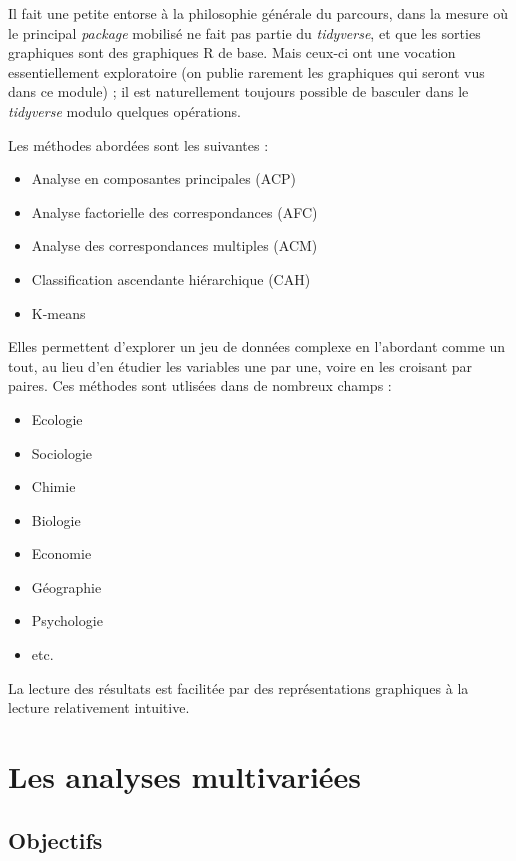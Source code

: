 \documentclass[]{book}
\providecommand{\tightlist}{%
  \setlength{\itemsep}{0pt}\setlength{\parskip}{0pt}}
\begin{document}
Il fait une petite entorse à la philosophie générale du parcours, dans la mesure où le principal \emph{package} mobilisé ne fait pas partie du \emph{tidyverse}, et que les sorties graphiques sont des graphiques R de base. Mais ceux-ci ont une vocation essentiellement exploratoire (on publie rarement les graphiques qui seront vus dans ce module) ; il est naturellement toujours possible de basculer dans le \emph{tidyverse} modulo quelques opérations.

Les méthodes abordées sont les suivantes :

\begin{itemize}
\tightlist
\item
  Analyse en composantes principales (ACP)
\item
  Analyse factorielle des correspondances (AFC)
\item
  Analyse des correspondances multiples (ACM)
\item
  Classification ascendante hiérarchique (CAH)
\item
  K-means
\end{itemize}

Elles permettent d'explorer un jeu de données complexe en l'abordant comme un tout, au lieu d'en étudier les variables une par une, voire en les croisant par paires. Ces méthodes sont utlisées dans de nombreux champs :

\begin{itemize}
\tightlist
\item
  Ecologie
\item
  Sociologie
\item
  Chimie
\item
  Biologie
\item
  Economie
\item
  Géographie
\item
  Psychologie
\item
  etc.
\end{itemize}

La lecture des résultats est facilitée par des représentations graphiques à la lecture relativement intuitive.

\hypertarget{intro}{%
\chapter{Les analyses multivariées}\label{intro}}

\hypertarget{objectifs}{%
\section{Objectifs}\label{objectifs}}
\end{document}
